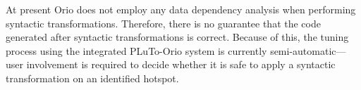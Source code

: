 At present Orio does not employ any data dependency analysis when performing
syntactic transformations. Therefore, there is no guarantee that the code
generated after syntactic transformations is correct. Because of this, the
tuning process using the integrated PLuTo-Orio system is currently
semi-automatic---user involvement is required to decide whether it is safe
to apply a syntactic transformation on an identified hotspot.




